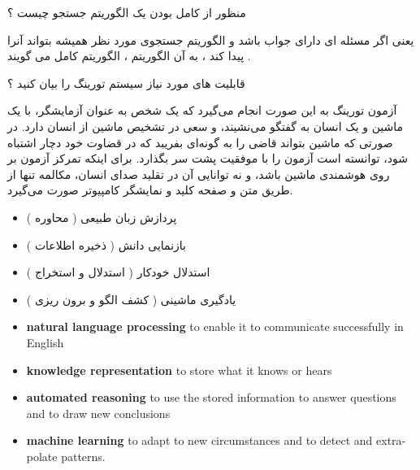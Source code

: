 \documentclass[12pt]{article}
\begin{document}
\vspace{30pt}

\noindent
منظور از کامل بودن یک الگوریتم جستجو چیست ؟

\vspace{10pt}

\begin{tcolorbox}
یعنی اگر مسئله ای دارای جواب باشد و الگوریتم جستجوی مورد نظر همیشه بتواند آنرا پیدا کند ، به آن الگوریتم ، الگوریتم کامل می گویند .
\end{tcolorbox}



\vspace{10pt}



\noindent
قابلیت های مورد نیاز سیستم تورینگ را بیان کنید ؟

\vspace{10pt}

\begin{tcolorbox}
آزمون تورینگ به این صورت انجام می‌گیرد که یک شخص به عنوان آزمایشگر، با یک ماشین و یک انسان به گفتگو می‌نشیند، و سعی در تشخیص ماشین از انسان دارد. در صورتی که ماشین بتواند قاضی را به گونه‌ای بفریبد که در قضاوت خود دچار اشتباه شود، توانسته‌ است آزمون را با موفقیت پشت سر بگذارد. برای اینکه تمرکز آزمون بر روی هوشمندی ماشین باشد، و نه توانایی آن در تقلید صدای انسان، مکالمه تنها از طریق متن و صفحه کلید و نمایشگر کامپیوتر صورت می‌گیرد. 
\end{tcolorbox}

\begin{tcolorbox}
\begin{itemize}
	\item پردازش زبان طبیعی ( محاوره )
	\item بازنمایی دانش ( ذخیره اطلاعات )
	\item استدلال خودکار ( استدلال و استخراج )
	\item یادگیری ماشینی ( کشف الگو و برون ریزی )
\end{itemize}
\end{tcolorbox}


\begin{latin}
\begin{tcolorbox}
\begin{itemize}
	\item \textbf{natural language processing} to enable it to communicate successfully in English
	\item \textbf{knowledge representation} to store what it knows or hears
	\item \textbf{automated reasoning} to use the stored information to answer questions and to draw
new conclusions
	\item \textbf{machine learning} to adapt to new circumstances and to detect and extrapolate patterns.
\end{itemize}
\end{tcolorbox}
\end{latin}
\end{document}
